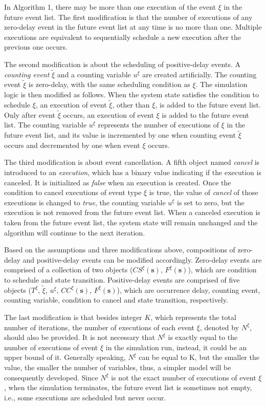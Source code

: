 \documentclass[]{interact}
\theoremstyle{plain}%
\theoremstyle{definition}
\theoremstyle{remark}
\begin{document}
In Algorithm 1, there may be more than one execution of the event $\xi$ in the future event list. The first modification is that the number of executions of any zero-delay event in the future event list at any time is no more than one. Multiple executions are equivalent to sequentially schedule a new execution after the previous one occurs. 

The second modification is about the scheduling of positive-delay events. A \textit{counting event} ${\tilde{\xi}}$ and a counting variable $u^{\xi}$ are created artificially. The counting event ${\tilde{\xi}}$ is zero-delay, with the same scheduling condition as ${\xi}$. The simulation logic is then modified as follows. When the system state satisfies the condition to schedule $\xi$, an execution of event $\tilde{\xi}$, other than $\xi$, is added to the future event list. Only after event ${\tilde{\xi}}$ occurs, an execution of event ${\xi}$ is added to the future event list. The counting variable $u^{\xi}$ represents the number of executions of ${\xi}$ in the future event list, and its value is incremented by one when counting event ${\tilde{\xi}}$ occurs and decremented by one when event ${\xi}$ occurs. 

The third modification is about event cancellation. A fifth object named \textit{cancel} is introduced to an \textit{execution}, which has a binary value indicating if the execution is canceled. It is initialized as \textit{false} when an execution is created. Once the condition to cancel executions of event type $\xi$ is true, the value of \textit{cancel} of those executions is changed to \textit{true}, the counting variable $u^{\xi}$ is set to zero, but the execution is not removed from the future event list. When a canceled execution is taken from the future event list, the system state will remain unchanged and the algorithm will continue to the next iteration. 

Based on the assumptions and three modifications above, compositions of zero-delay and positive-delay events can be modified accordingly. Zero-delay events are comprised of a collection of two objects ($CS^{\xi}(\mathbf{s})$, $F^{\xi}(\mathbf{s})$), which are condition to schedule and state transition. Positive-delay events are comprised of five objects ($T^{\xi}$, $\tilde{\xi}$, $u^{\xi}$, $CC^{\xi}(\mathbf{s})$, $F^{\xi}(\mathbf{s})$), which are occurrence delay, counting event, counting variable, condition to cancel and state transition, respectively.

The last modification is that besides integer $K$, which represents the total number of iterations, the number of executions of each event $\xi$, denoted by $N^{\xi}$, should also be provided. It is not necessary that $N^{\xi}$ is exactly equal to the number of executions of event $\xi$ in the simulation run, instead, it could be an upper bound of it. Generally speaking, $N^{\xi}$ can be equal to K, but the smaller the value, the smaller the number of variables, thus, a simpler model will be consequently developed. Since $N^{\xi}$ is not the exact number of executions of event $\xi$, when the simulation terminates, the future event list is sometimes not empty, i.e., some executions are scheduled but never occur.
\end{document}
